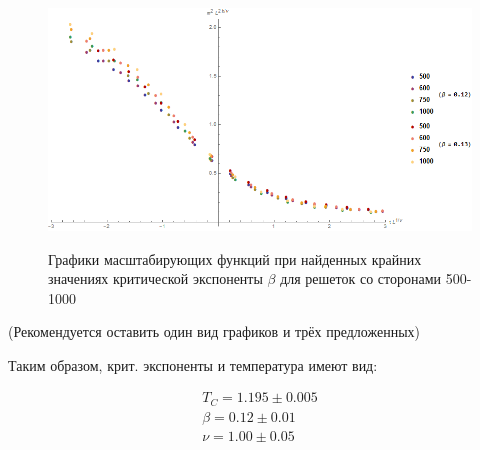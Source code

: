 \begin{figure}[!h]
    \centering
    \includegraphics[width=150mm]{Sections/Images/ErrB2_2.png}
    \label{fig:DatColM2_2}
    \caption{Графики масштабирующих функций при найденных крайних значениях критической экспоненты $\beta$ для решеток со сторонами 500-1000}
\end{figure}

(Рекомендуется оставить один вид графиков и трёх предложенных)

Таким образом, крит. экспоненты и температура имеют вид:

\begin{align*}
    T_{C} = 1.195 \pm 0.005 \\
    \beta = 0.12 \pm 0.01 \\
    \nu = 1.00 \pm 0.05
\end{align*}